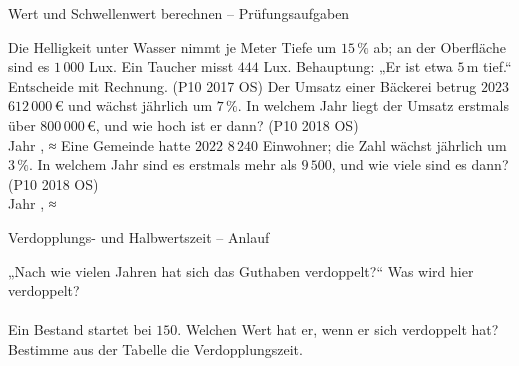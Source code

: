 \begin{aufgabe}{Wert und Schwellenwert berechnen – Prüfungsaufgaben}
\begin{teile}
\teil Die Helligkeit unter Wasser nimmt je Meter Tiefe um $15\,\%$ ab; an der Oberfläche sind es $1\,000$ Lux. Ein Taucher misst $444$ Lux. Behauptung: „Er ist etwa $5\,\mathrm{m}$ tief.“ Entscheide mit Rechnung. \hfill (P10 2017 OS)
\teil Der Umsatz einer Bäckerei betrug $2023$ $612\,000\,€$ und wächst jährlich um $7\,\%$. In welchem Jahr liegt der Umsatz erstmals über $800\,000\,€$, und wie hoch ist er dann? \hfill (P10 2018 OS) \\ Jahr \leerfeld , ≈ \leerfeld[€]
\teil Eine Gemeinde hatte $2022$ $8\,240$ Einwohner; die Zahl wächst jährlich um $3\,\%$. In welchem Jahr sind es erstmals mehr als $9\,500$, und wie viele sind es dann? \hfill (P10 2018 OS) \\ Jahr \leerfeld , ≈ \leerfeld
\end{teile}
\end{aufgabe}

\begin{aufgabe}{Verdopplungs- und Halbwertszeit – Anlauf}
\begin{teile}
\teil „Nach wie vielen Jahren hat sich das Guthaben verdoppelt?“ Was wird hier verdoppelt? \\  \\ 
\teil Ein Bestand startet bei $150$. Welchen Wert hat er, wenn er sich verdoppelt hat? \leerfeld
\teil Bestimme aus der Tabelle die Verdopplungszeit.  \leerfeld[Jahre]
\end{teile}
\end{aufgabe}

